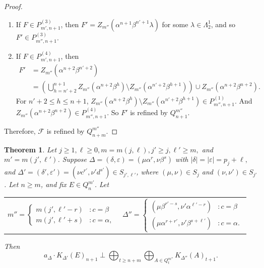 \documentclass[12pt]{amsart}
\newcommand{\sm}{\setminus}
\newcommand{\mc}[1]{\mathcal{#1}}
\newcommand{\al}{\alpha}
\newcommand{\be}{\beta}
\newcommand{\de}{\delta}
\newcommand{\De}{\Delta}
\newcommand{\ep}{\varepsilon}
\newcommand{\la}{\lambda}
\newcommand{\La}{\Lambda}
\theoremstyle{plain} %
\newtheorem{Theorem}{Theorem}[section]
\theoremstyle{definition} %
\begin{document}
\begin{proof}
\begin{enumerate}
    So $F'$ is refined by $Q_{n+1}^{m''}$.

    \item If $F \in P^{(3)}_{m',n+1}$, then $F' = Z_{m''}(\al^{n+1}\be^{n'+1} \la)$ for some $\la \in \La_2^1$, and so $F' \in P^{(3)}_{m'', n+1}$.

    \item If $F \in P^{(4)}_{m',n+1}$, then \begin{align*}
        F' &= Z_{m''}(\al^{n+2}\be^{n'+2})\\
        &= \left( \bigcup_{h=n'+2}^{n+1} Z_{m''}(\al^{n+2}\be^{h}) \sm Z_{m''}(\al^{n'+2}\be^{h+1}) \right) \cup Z_{m''}(\al^{n+2}\be^{n+2}).
    \end{align*}
    For $n'+2 \le h \le n+1$, $Z_{m''}(\al^{n+2}\be^{h}) \sm Z_{m''}(\al^{n'+2}\be^{h+1}) \in P^{(1)}_{m'',n+1}$. And $Z_{m''}(\al^{n+2}\be^{n+2}) \in P^{(4)}_{m'',n+1}$. So $F'$ is refined by $Q^{m''}_{n+1}$.
    \end{enumerate}
    Therefore, $\mc{F}$ is refined by $Q^{m''}_{n+m}$.
\end{proof}

\begin{Theorem}\label{thm a acts on K 3}
    Let $j \geq 1, \ell \geq 0, m = m(j,\ell), j' \geq j, \ell' \ge m,$ and $m' = m(j', \ell')$. Suppose $\De = (\de, \ep) = (\mu\al^r, \nu\be^s) $ with $|\de| = |\ep| = p_j + \ell,$ and $\De' =(\de', \ep') = (\nu c^{r'}, \nu'd^{s'}) \in S_{j', \ell'}$, where $(\mu,\nu) \in S_j$ and $(\nu,\nu') \in S_{j'}$. Let $n \geq m$, and fix $E \in Q_n^{m'}$. Let

    \begin{tabular}{l l}
    $m'' = \begin{cases}
        m(j', \ell'-r) &: c=\be\\
        m(j', \ell'+s) &: c=\al,
    \end{cases}$
    & $\De'' = \begin{cases}
        (\mu \be^{r'-s}, \nu'\al^{\ell'-r}) &: c=\be\\ (\mu\al^{r+r'}, \nu'\be^{s+\ell'}) &: c=\al.
    \end{cases}$\\
\end{tabular}


Then \[ a_{\De} \cdot K_{\De'}(E)_{n+1} \perp \bigoplus_{t \ge n+m} \bigoplus_{A \in Q_{t}^{m''}} K_{\De''}(A)_{t+1}.\]
\end{Theorem}
\end{document}

